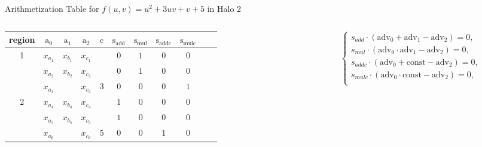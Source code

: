 \documentclass{beamer}
\begin{document}
\begin{frame}{Arithmetization Table for $f(u, v) = u^2 + 3uv + v + 5$ in Halo 2}
\begin{figure}
		\end{figure}
		\begin{columns}
			\begin{column}{0.5\textwidth}
				\begin{center}
					\begin{table}
						\scriptsize
						\setlength\tabcolsep{1.5pt}
						\begin{tabular}{|c|c|c|c|c|c|c|c|c|c|c|}
							\hline
							region&$\text{a}_0$&$\text{a}_1$&$\text{a}_2$&$\text{c}$&$\text{s}_\text{add}$&$\text{s}_\text{mul}$&$\text{s}_\text{addc}$&$\text{s}_\text{mulc}$\\
							\hline
							1&$x_{a_1}$&$x_{b_1}$&$x_{c_1}$& & $0$ & $1$ & $0$ & $0$ \\
							&$x_{a_2}$&$x_{b_2}$&$x_{c_2}$& & $0$ & $1$ & $0$ & $0$\\
							&$x_{a_3}$&&$x_{c_3}$& $3$ & $0$ & $0$ & $0$ & $1$ \\
							\hline
							2&$x_{a_4}$&$x_{b_4}$&$x_{c_4}$& & $1$ & $0$ & $0$ & $0$ \\
							&$x_{a_5}$&$x_{b_5}$&$x_{c_5}$& & $1$ & $0$ & $0$ & $0$\\
							&$x_{a_6}$&&$x_{c_6}$& $5$ & $0$ & $0$ & $1$ & $0$\\
							\hline
						\end{tabular}
					\end{table}
				\end{center}
			\end{column}
			\begin{column}{0.4\textwidth}
				\begin{equation*}
					\begin{cases}
						s_{add} \cdot (\text{adv}_0 + \text{adv}_1 - \text{adv}_2) = 0,\\ 
						s_{mul} \cdot (\text{adv}_0 \cdot \text{adv}_1 - \text{adv}_2) = 0,\\
						s_{addc} \cdot (\text{adv}_0 + \text{const} - \text{adv}_2) = 0,\\ 
						s_{mulc} \cdot (\text{adv}_0 \cdot \text{const} - \text{adv}_2) = 0,\\ 
					\end{cases}
				\end{equation*}
			\end{column}
		\end{columns}
		

\end{frame}
\end{document}

